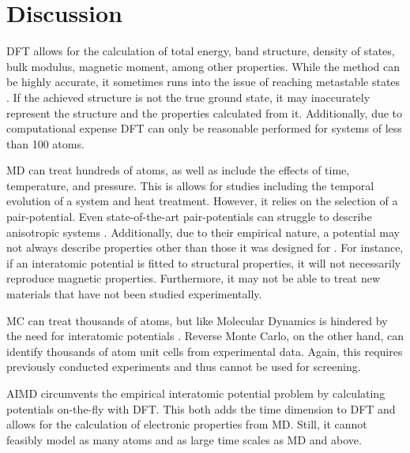 \documentclass[3p,review,12pt]{elsarticle}
\begin{document}
\section{Discussion}
DFT allows for the calculation of total energy, band structure, density of states, bulk modulus, magnetic moment, among other properties. While the method can be highly accurate, it sometimes runs into the issue of reaching metastable states \cite{Dorado2013}. If the achieved structure is not the true ground state, it may inaccurately represent the structure and the properties calculated from it. Additionally, due to computational expense DFT can only be reasonable performed for systems of less than 100 atoms.
\par 
MD can treat hundreds of atoms, as well as include the effects of time, temperature, and pressure. This is allows for studies including the temporal evolution of a system and heat treatment. However, it relies on the selection of a pair-potential. Even state-of-the-art pair-potentials can struggle to describe anisotropic systems \cite{Hohl1991}. Additionally, due to their empirical nature, a potential may not always describe properties other than those it was designed for \cite{Cliffe2017, Car1988}. For instance, if an interatomic potential is fitted to structural properties, it will not necessarily reproduce magnetic properties. Furthermore, it may not be able to treat new materials that have not been studied experimentally.
\par 
MC can treat thousands of atoms, but like Molecular Dynamics is hindered by the need for interatomic potentials \cite{Car1988}. Reverse Monte Carlo, on the other hand, can identify thousands of atom unit cells from experimental data. Again, this requires previously conducted experiments and thus cannot be used for screening.
\par 
AIMD circumvents the empirical interatomic potential problem by calculating potentials on-the-fly with DFT.  This both adds the time dimension to DFT and allows for the calculation of electronic properties from MD. Still, it cannot feasibly model as many atoms and as large time scales as MD and above.
\par 
\end{document}
